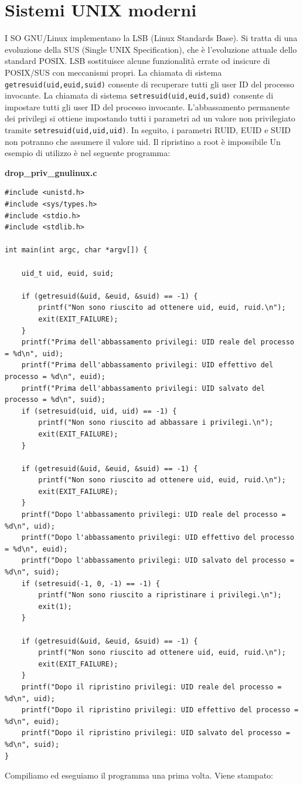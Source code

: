 \section{Sistemi UNIX moderni}
I SO GNU/Linux implementano la LSB
(Linux Standards Base). Si tratta di una evoluzione della SUS (Single
UNIX Specification), che è l’evoluzione attuale
dello standard POSIX. LSB sostituisce alcune funzionalità errate od
insicure di POSIX/SUS con meccanismi propri. La chiamata di sistema
\texttt{getresuid(uid,euid,suid)} consente di
recuperare tutti gli user ID del processo
invocante. La chiamata di sistema
\texttt{setresuid(uid,euid,suid)} consente di
impostare tutti gli user ID del processo
invocante. L’abbassamento permanente dei privilegi si
ottiene impostando tutti i parametri ad un
valore non privilegiato tramite \texttt{setresuid(uid,uid,uid)}. In seguito, i parametri RUID, EUID e SUID
non potranno che assumere il valore uid. Il ripristino a root è impossibile Un esempio di utilizzo è nel seguente programma:


\begin{mdframed}[backgroundcolor=white!20,shadow=false]
\textbf{drop\_priv\_gnulinux.c}
\begin{verbatim}
#include <unistd.h>
#include <sys/types.h>
#include <stdio.h>
#include <stdlib.h>

int main(int argc, char *argv[]) {

	uid_t uid, euid, suid;

	if (getresuid(&uid, &euid, &suid) == -1) {
		printf("Non sono riuscito ad ottenere uid, euid, ruid.\n");
		exit(EXIT_FAILURE);
	}
	printf("Prima dell'abbassamento privilegi: UID reale del processo = %d\n", uid);
	printf("Prima dell'abbassamento privilegi: UID effettivo del processo = %d\n", euid);
	printf("Prima dell'abbassamento privilegi: UID salvato del processo = %d\n", suid);
	if (setresuid(uid, uid, uid) == -1) {
		printf("Non sono riuscito ad abbassare i privilegi.\n");
		exit(EXIT_FAILURE);
	}

	if (getresuid(&uid, &euid, &suid) == -1) {
		printf("Non sono riuscito ad ottenere uid, euid, ruid.\n");
		exit(EXIT_FAILURE);
	}
	printf("Dopo l'abbassamento privilegi: UID reale del processo = %d\n", uid);
	printf("Dopo l'abbassamento privilegi: UID effettivo del processo = %d\n", euid);
	printf("Dopo l'abbassamento privilegi: UID salvato del processo = %d\n", suid);
	if (setresuid(-1, 0, -1) == -1) {
		printf("Non sono riuscito a ripristinare i privilegi.\n");
		exit(1);
	}

	if (getresuid(&uid, &euid, &suid) == -1) {
		printf("Non sono riuscito ad ottenere uid, euid, ruid.\n");
		exit(EXIT_FAILURE);
	}
	printf("Dopo il ripristino privilegi: UID reale del processo = %d\n", uid);
	printf("Dopo il ripristino privilegi: UID effettivo del processo = %d\n", euid);
	printf("Dopo il ripristino privilegi: UID salvato del processo = %d\n", suid);
}

\end{verbatim}
\end{mdframed}
Compiliamo ed eseguiamo il programma una prima volta. Viene stampato:

